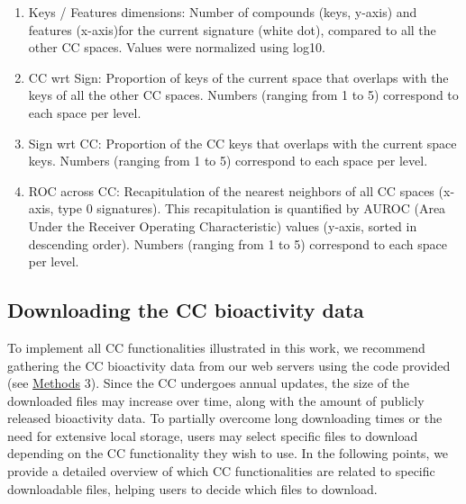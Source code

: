 \begin{enumerate}
    \item[\textbullet]Keys / Features dimensions: Number of compounds (keys, y-axis) and features (x-axis)for the current signature (white dot), compared to all the other CC spaces. Values were normalized using log10.
    \item[\textbullet]CC wrt Sign: Proportion of keys of the current space that overlaps with the keys of all the other CC spaces. Numbers (ranging from 1 to 5) correspond to each space per level.
    \item[\textbullet]Sign wrt CC: Proportion of the CC keys that overlaps with the current space keys. Numbers (ranging from 1 to 5) correspond to each space per level.
    \item[\textbullet]ROC across CC: Recapitulation of the nearest neighbors of all CC spaces (x-axis, type 0 signatures). This recapitulation is quantified by AUROC (Area Under the Receiver Operating Characteristic) values (y-axis, sorted in descending order). Numbers (ranging from 1 to 5) correspond to each space per level.
\end{enumerate}


\subsection{Downloading the CC bioactivity data}
\label{Supplementary_Protocols_DownloadingData}

To implement all CC functionalities illustrated in this work, we recommend gathering the CC bioactivity data from our web servers using the code provided (see \hyperref[Protocols_Methods]{Methods} 3). Since the CC undergoes annual updates, the size of the downloaded files may increase over time, along with the amount of publicly released bioactivity data. To partially overcome long downloading times or the need for extensive local storage, users may select specific files to download depending on the CC functionality they wish to use. In the following points, we provide a detailed overview of which CC functionalities are related to specific downloadable files, helping users to decide which files to download.

